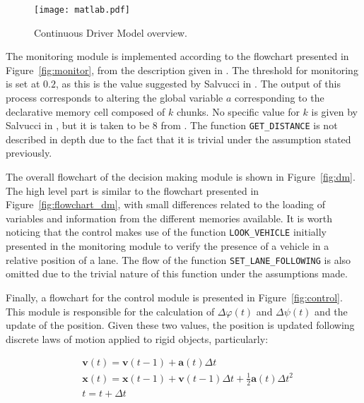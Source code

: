 \vspace{1em}
\begin{figure}[h]
    \centering
    \texttt{[image: matlab.pdf]}
    \caption{Continuous Driver Model overview.}
    \label{fig:driver_model_overview}
\end{figure}

The monitoring module is implemented according to the flowchart presented in Figure~\ref{fig:monitor}, from the description given in \cite{salvucci_1}. The threshold for monitoring is set at $0.2$, as this is the value suggested by Salvucci in \cite{salvucci_1}. The output of this process corresponds to altering the global variable $a$ corresponding to the declarative memory cell composed of $k$ chunks. No specific value for $k$ is given by Salvucci in \cite{salvucci_1}, but it is taken to be 8 from \cite{lam}. The function \texttt{GET\_DISTANCE} is not described in depth due to the fact that it is trivial under the assumption stated previously.

The overall flowchart of the decision making module is shown in Figure~\ref{fig:dm}. The high level part is similar to the flowchart presented in Figure~\ref{fig:flowchart_dm}, with small differences related to the loading of variables and information from the different memories available. It is worth noticing that the control makes use of the function \texttt{LOOK\_VEHICLE} initially presented in the monitoring module to verify the presence of a vehicle in a relative position of a lane. The flow of the function \texttt{SET\_LANE\_FOLLOWING} is also omitted due to the trivial nature of this function under the assumptions made.

Finally, a flowchart for the control module is presented in Figure~\ref{fig:control}. This module is responsible for the calculation of $\Delta\varphi(t)$ and $\Delta\psi(t)$ and the update of the position. Given these two values, the position is updated following discrete laws of motion applied to rigid objects, particularly:

\begin{equation}
\begin{aligned}
	& \mathbf{v}(t) = \mathbf{v}(t-1) + \mathbf{a}(t)\Delta t\\
	& \mathbf{x}(t) = \mathbf{x}(t-1) + \mathbf{v}(t-1)\Delta t + \frac{1}{2}  \mathbf{a}(t)\Delta t^2 \\
	& t = t + \Delta t
\end{aligned}
\end{equation}

